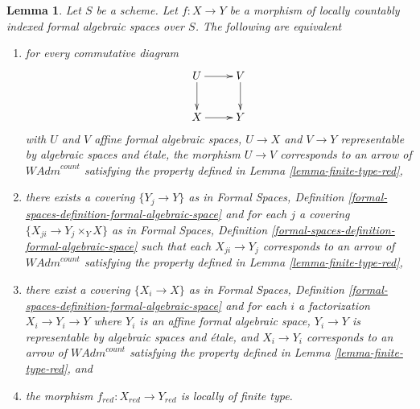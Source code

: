 \documentclass{stacks-project}
\theoremstyle{plain}
\newtheorem{lemma}[subsection]{Lemma}
\theoremstyle{definition}
\theoremstyle{remark}
\numberwithin{equation}{subsection}
\begin{document}
\begin{lemma}
\label{lemma-finite-type-red-morphisms}
Let $S$ be a scheme. Let $f : X \to Y$ be a morphism of
locally countably indexed formal algebraic spaces over $S$.
The following are equivalent
\begin{enumerate}
\item for every commutative diagram
$$
\xymatrix{
U \ar[d] \ar[r] & V \ar[d] \\
X \ar[r] & Y
}
$$
with $U$ and $V$ affine formal algebraic spaces, $U \to X$ and $V \to Y$
representable by algebraic spaces and \'etale, the morphism $U \to V$
corresponds to an arrow of $\textit{WAdm}^{count}$ satisfying the
property defined in Lemma \ref{lemma-finite-type-red},
\item there exists a covering $\{Y_j \to Y\}$ as in
Formal Spaces,
Definition \ref{formal-spaces-definition-formal-algebraic-space}
and for each $j$
a covering $\{X_{ji} \to Y_j \times_Y X\}$ as in
Formal Spaces,
Definition \ref{formal-spaces-definition-formal-algebraic-space}
such that each $X_{ji} \to Y_j$  corresponds
to an arrow of $\textit{WAdm}^{count}$ satisfying the
property defined in Lemma \ref{lemma-finite-type-red},
\item there exist a covering $\{X_i \to X\}$ as in
Formal Spaces,
Definition \ref{formal-spaces-definition-formal-algebraic-space}
and for each $i$ a factorization $X_i \to Y_i \to Y$ where $Y_i$
is an affine formal algebraic space, $Y_i \to Y$ is representable
by algebraic spaces and \'etale, and $X_i \to Y_i$ corresponds
to an arrow of $\textit{WAdm}^{count}$ satisfying the
property defined in Lemma \ref{lemma-finite-type-red}, and
\item the morphism $f_{red} : X_{red} \to Y_{red}$ is locally of finite type.
\end{enumerate}
\end{lemma}
\end{document}
